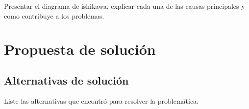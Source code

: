 Presentar el diagrama de ishikawa, explicar cada una de las causas principales y como contribuye a los problemas.

\section{Propuesta de solución}

\subsection{Alternativas de solución}

Liste las alternativas que encontró para resolver la problemática.
